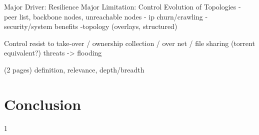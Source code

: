 \documentclass{acm_proc_article-sp}
\begin{document}
Major Driver: Resilience
Major Limitation: Control
Evolution of Topologies
    - peer list, backbone nodes, unreachable nodes
    - ip churn/crawling
    - security/system benefits
    -topology (overlays, structured)


Control
resist to take-over / ownership
collection / 
over net / file sharing (torrent equivalent?)
threats -> flooding

(2 pages)
definition, relevance, depth/breadth


\section{Conclusion}


1


\printbibliography{}
\end{document}
